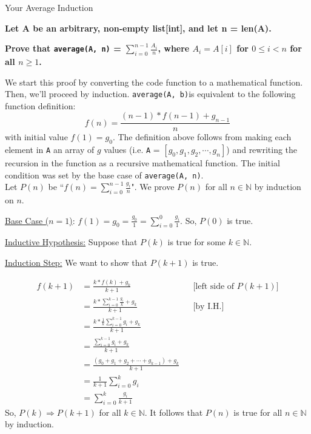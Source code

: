 \documentclass[11pt, nopagenumbers]{adamblan-hw}
\begin{document}
\begin{question}{Your Average Induction}

\textbf{Let A be an arbitrary, non-empty list[int], and let n = len(A).}

\textbf{Prove that \texttt{average(A, n)} = $\sum\limits_{i=0}^{n-1}{\frac{A_i}{n}}$, 
where $A_i = A[i]$ for $0 \leq i < n$ for all $n \geq 1$.}

We start this proof by converting the code function to a mathematical function. Then, we'll proceed by induction.
\texttt{average(A, b)}is equivalent to the following function definition: $$f(n) = \frac{(n - 1) * f(n-1) + g_{n-1}}{n}$$
with initial value $f(1) = g_0$. The definition above follows from making each element in \texttt{A} an array of $g$ values 
(i.e. \texttt{A} = $[g_0, g_1, g_2, \cdots, g_n]$) and rewriting the recursion in the function as a
recursive mathematical function. The initial condition was set by the base case of \texttt{average(A, n)}. \\

Let $P(n)$ be ``$f(n) = \sum\limits_{i=0}^{n-1}{\frac{g_i}{n}}$". We prove $P(n)$ for all
$n \in \mathbb{N}$ by induction on $n$.

\underline{Base Case ($n=1$)}: $f(1) = g_0 = \frac{g_0}{1} = \sum\limits_{i=0}^{0}{\frac{g_i}{1}}$. So, $P(0)$ is true.

\underline{Inductive Hypothesis:} Suppose that $P(k)$ is true for some $k \in \mathbb{N}$.

\underline{Induction Step:} We want to show that $P(k + 1)$ is true.

\begin{align*}
f(k + 1) &= \frac{k * f(k) + g_k}{k + 1} && \text{[left side of $P(k + 1)$]} \\
&= \frac{k * \sum\limits_{i = 0}^{k-1}{\frac{g_i}{k}} + g_k}{k + 1} && \text{[by I.H.]} \\
&= \frac{k * \frac{1}{k}\sum\limits_{i = 0}^{k-1}{g_i} + g_k}{k + 1} \\
&= \frac{\sum\limits_{i = 0}^{k-1}{g_i} + g_k}{k + 1} \\
&= \frac{(g_0 + g_1 + g_2 + \cdots + g_{k-1}) + g_k}{k + 1} \\
&= \frac{1}{k + 1} \sum_{i=0}^{k}{g_i} \\
&= \sum_{i=0}^{k}{\frac{g_i}{k + 1}}
\end{align*}
So, $P(k) \Rightarrow P(k + 1)$ for all $k \in \mathbb{N}$.
It follows that $P(n)$ is true for all $n \in \mathbb{N}$ by induction.
\end{question}
\end{document}
